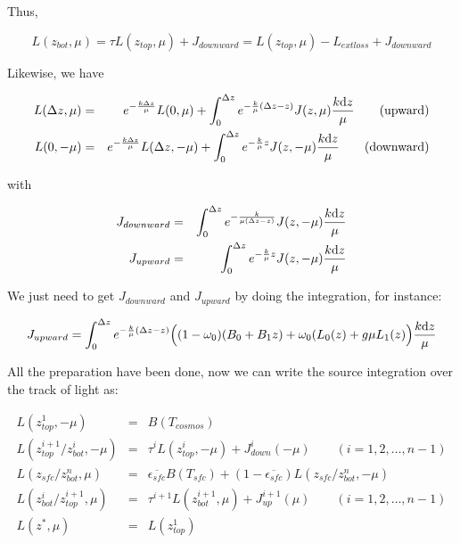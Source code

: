 Thus,

\begin{equation} \label{eq:simplified}
    L(z_{bot}, \mu) = \tau L(z_{top}, \mu) + J_{downward} 
    = L(z_{top}, \mu) - L_{extloss} + J_{downward}  
\end{equation}

Likewise, we have

\begin{eqnarray} \label{eq:integratesource2}
    L(\Delta z, \mu) & = & e^{-\frac{k\Delta z}{\mu}}L(0, \mu) + \int_{0}^{\Delta z}
    e^{-\frac{k}{\mu}(\Delta z - z)}J(z, \mu)\frac{k\mathrm{d} z}{\mu} \qquad \textrm{(upward)}  \nonumber\\
    L(0, -\mu) & = & e^{-\frac{k\Delta z}{\mu}}L(\Delta z, -\mu) + \int_{0}^{\Delta z}
    e^{-\frac{k}{\mu}z}J(z, -\mu)\frac{k\mathrm{d} z}{\mu} \qquad \textrm{(downward)}
\end{eqnarray}

with

\begin{eqnarray} \label{eq:jspecify}
    J_{downward} & = & \int_{0}^{\Delta z}
    e^{-\frac{k}{\mu(\Delta z - z)}}J(z, -\mu)\frac{k\mathrm{d} z}{\mu} \nonumber \\
    J_{upward} & = & \int_{0}^{\Delta z}
    e^{-\frac{k}{\mu}z}J(z, -\mu)\frac{k\mathrm{d} z}{\mu}
\end{eqnarray}

We just need to get $J_{downward}$ and $J_{upward}$ by doing the integration,
for instance:

\begin{displaymath} 
    J_{upward} = \int_{0}^{\Delta z}
    e^{-\frac{k}{\mu}(\Delta z - z)}
    \Big(
        (1-\omega_{0})(B_{0}+B_{1}z) + \omega_{0}(L_{0}(z) + g\mu L_{1}(z)
    \Big)
    \frac{k\mathrm{d} z}{\mu}
\end{displaymath}


All the preparation have been done, now we can write the source integration over
the track of light as:


\begin{eqnarray} \label{eq:sequential}
    L(z_{top}^{1}, -\mu) & = & B(T_{cosmos}) \nonumber\\
    L(z_{top}^{i+1}/z_{bot}^{i}, -\mu) & = & \tau^{i}L(z_{top}^{i}, -\mu) + J_{down}^{i}(-\mu) 
    \qquad (i=1,2, \ldots, n-1) \nonumber\\
    L(z_{sfc}/z_{bot}^{n}, \mu) & = & \overline{\epsilon_{sfc}}B(T_{sfc}) 
    + (1-\overline{\epsilon_{sfc}})L(z_{sfc}/z_{bot}^{n}, -\mu) \nonumber\\
    L(z_{bot}^{i}/z_{top}^{i+1}, \mu) & = & \tau^{i+1}L(z_{bot}^{i+1}, \mu) + J_{up}^{i+1}(\mu) 
    \qquad (i=1,2, \ldots, n-1) \nonumber\\
    L(z^{*}, \mu) & = & L(z_{top}^{1})
\end{eqnarray}


